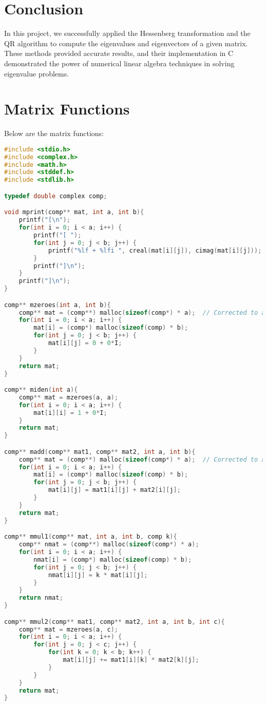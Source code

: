\documentclass[journal,12pt,onecolumn]{IEEEtran}
\theoremstyle{remark}
\begin{document}
	
	\section{Conclusion}
	In this project, we successfully applied the Hessenberg transformation and the QR algorithm to compute the eigenvalues and eigenvectors of a given matrix. These methods provided accurate results, and their implementation in C demonstrated the power of numerical linear algebra techniques in solving eigenvalue problems.
\newpage	
\section{Matrix Functions}
Below are the matrix functions:
	
\begin{lstlisting}[language=C]
#include <stdio.h>
#include <complex.h>
#include <math.h>
#include <stddef.h>
#include <stdlib.h>

typedef double complex comp;

void mprint(comp** mat, int a, int b){
	printf("[\n");
	for(int i = 0; i < a; i++) {
		printf("[ ");
		for(int j = 0; j < b; j++) {
			printf("%lf + %lfi ", creal(mat[i][j]), cimag(mat[i][j]));
		}
		printf("]\n");
	}
	printf("]\n");
}

comp** mzeroes(int a, int b){
	comp** mat = (comp**) malloc(sizeof(comp*) * a);  // Corrected to allocate pointer array
	for(int i = 0; i < a; i++) {
		mat[i] = (comp*) malloc(sizeof(comp) * b);
		for(int j = 0; j < b; j++) {
			mat[i][j] = 0 + 0*I;
		}
	}
	return mat;
}

comp** miden(int a){
	comp** mat = mzeroes(a, a);
	for(int i = 0; i < a; i++) {
		mat[i][i] = 1 + 0*I;
	}
	return mat;
}

comp** madd(comp** mat1, comp** mat2, int a, int b){
	comp** mat = (comp**) malloc(sizeof(comp*) * a);  // Corrected to allocate pointer array
	for(int i = 0; i < a; i++) {
		mat[i] = (comp*) malloc(sizeof(comp) * b);
		for(int j = 0; j < b; j++) {
			mat[i][j] = mat1[i][j] + mat2[i][j];
		}
	}
	return mat;
}

comp** mmul1(comp** mat, int a, int b, comp k){
	comp** nmat = (comp**) malloc(sizeof(comp*) * a);
	for(int i = 0; i < a; i++) {
		nmat[i] = (comp*) malloc(sizeof(comp) * b);
		for(int j = 0; j < b; j++) {
			nmat[i][j] = k * mat[i][j];
		}
	}
	return nmat;
}

comp** mmul2(comp** mat1, comp** mat2, int a, int b, int c){
	comp** mat = mzeroes(a, c);
	for(int i = 0; i < a; i++) {
		for(int j = 0; j < c; j++) {
			for(int k = 0; k < b; k++) {
				mat[i][j] += mat1[i][k] * mat2[k][j];
			}
		}
	}
	return mat;
}


\end{lstlisting}
\end{document}
